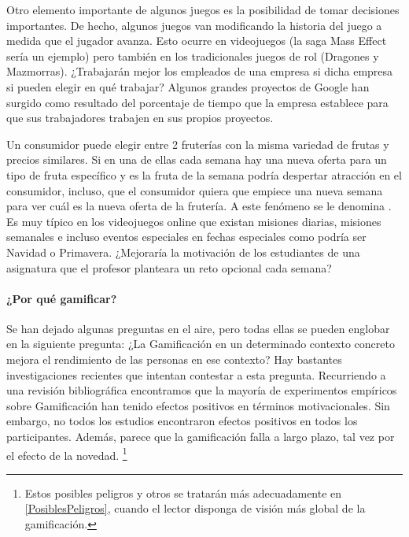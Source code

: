 Otro elemento importante de algunos juegos es la posibilidad de tomar decisiones importantes.
%
De hecho, algunos juegos van modificando la historia del juego a medida que el jugador avanza. 
%
Esto ocurre en videojuegos (la saga Mass Effect sería un ejemplo) pero también en los tradicionales juegos de rol (Dragones y Mazmorras).
%
¿Trabajarán mejor los empleados de una empresa si dicha empresa si pueden elegir en qué trabajar?
%
Algunos grandes proyectos de Google han surgido como resultado del porcentaje de tiempo que la empresa establece para que sus trabajadores trabajen en sus propios proyectos.

Un consumidor puede elegir entre 2 fruterías con la misma variedad de frutas y precios similares.
%
Si en una de ellas cada semana hay una nueva oferta para un tipo de fruta específico y es la fruta de la semana podría despertar atracción en el consumidor, incluso, que el consumidor quiera que empiece una nueva semana para ver cuál es la nueva oferta de la frutería.
%
A este fenómeno se le denomina . 
%
Es muy típico en los videojuegos online que existan misiones diarias, misiones semanales e incluso eventos especiales en fechas especiales como podría ser Navidad o Primavera.
%
¿Mejoraría la motivación de los estudiantes de una asignatura que el profesor planteara un reto opcional cada semana?



\paragraph{¿Por qué gamificar?} Se han dejado algunas preguntas en el aire, pero todas ellas se pueden englobar en la siguiente pregunta: ¿La Gamificación en un determinado contexto concreto mejora el rendimiento de las personas en ese contexto?
%
Hay bastantes investigaciones recientes que intentan contestar a esta pregunta.
%
Recurriendo a una revisión bibliográfica \cite{EmpiricalGamification} encontramos que la mayoría de experimentos empíricos sobre Gamificación han tenido efectos positivos en términos motivacionales.
%
Sin embargo, no todos los estudios encontraron efectos positivos en todos los participantes.
%
Además, parece que la gamificación falla a largo plazo, tal vez por el efecto de la novedad. 
%
\footnote{Estos posibles peligros y otros se tratarán más adecuadamente en \ref{PosiblesPeligros}, cuando el lector disponga de visión más global de la gamificación.}

